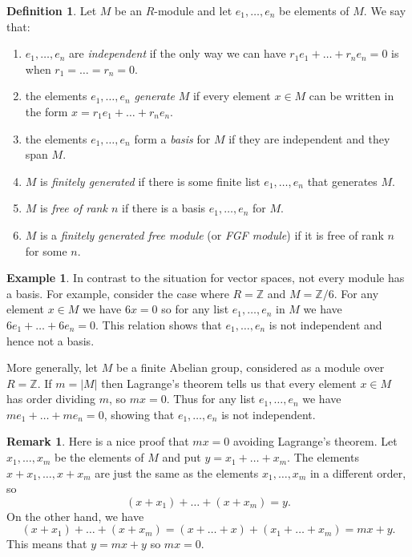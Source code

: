 \documentclass{amsart}
\newcommand{\Z}         {{\mathbb{Z}}}
\renewcommand{\:}{\colon}
\theoremstyle{definition}
\newtheorem{remark}[theorem]{Remark}
\newtheorem{definition}[theorem]{Definition}
\newtheorem{example}[theorem]{Example}
\begin{document}
\begin{definition}
 Let $M$ be an $R$-module and let $e_1,\ldots,e_n$ be elements of
 $M$.  We say that:
 \begin{enumerate}
 \item $e_1,\ldots,e_n$ are \emph{independent} if the only
  way we can have $r_1e_1+\ldots+r_ne_n=0$ is when $r_1=\ldots=r_n=0$.
 \item the elements $e_1,\ldots,e_n$ \emph{generate} $M$ if every
  element $x\in M$ can be written in the form
  $x=r_1e_1+\ldots+r_ne_n$.
 \item the elements $e_1,\ldots,e_n$ form a \emph{basis} for $M$ if
  they are independent and they span $M$.
 \item $M$ is \emph{finitely generated} if there is some finite list
  $e_1,\ldots,e_n$ that generates $M$.
 \item $M$ is \emph{free of rank $n$} if there is a basis
  $e_1,\ldots,e_n$ for $M$.
 \item $M$ is a \emph{finitely generated free module} (or \emph{FGF
    module}) if it is free of rank $n$ for some $n$.
 \end{enumerate}
\end{definition}
\begin{example}
 In contrast to the situation for vector spaces, not every module has
 a basis.  For example, consider the case where $R=\Z$ and $M=\Z/6$.
 For any element $x\in M$ we have $6x=0$ so for any list
 $e_1,\ldots,e_n$ in $M$ we have $6e_1+\ldots+6e_n=0$.  This relation
 shows that $e_1,\ldots,e_n$ is not independent and hence not a basis.

 More generally, let $M$ be a finite Abelian group, considered as a
 module over $R=\Z$.  If $m=|M|$ then Lagrange's theorem tells us that
 every element $x\in M$ has order dividing $m$, so $mx=0$.  Thus for
 any list $e_1,\ldots,e_n$ we have $me_1+\ldots+me_n=0$, showing that
 $e_1,\ldots,e_n$ is not independent.
\end{example}
\begin{remark}
 Here is a nice proof that $mx=0$ avoiding Lagrange's theorem.  Let
 $x_1,\ldots,x_m$ be the elements of $M$ and put $y=x_1+\ldots+x_m$.
 The elements $x+x_1,\ldots,x+x_m$ are just the same as the elements
 $x_1,\ldots,x_m$ in a different order, so 
 \[ (x + x_1) + \ldots + (x + x_m) = y. \]
 On the other hand, we have
 \[ (x + x_1) + \ldots + (x + x_m) = (x+\ldots+x)+(x_1+\ldots+x_m)
     = mx+y.
 \]
 This means that $y=mx+y$ so $mx=0$.
\end{remark}
\end{document}
